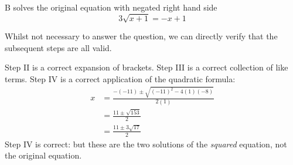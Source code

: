 \documentclass[11pt,a4paper]{article}
\begin{document}
\begin{enumerate}[label=\textbf{\arabic*.},leftmargin=*,itemsep=0pt,start=4]
\begin{djsSolution}{B}
solves the original equation with negated right hand side
\[ 3\sqrt{x+1}=-x+1 \]

Whilst not necessary to answer the question, we can directly verify that the subsequent steps are all valid. 

Step II is a correct expansion of brackets. Step III is a correct collection of like terms. Step IV is a correct application of the quadratic formula:
\[
\begin{aligned}
x&=\frac{-(-11)\pm\sqrt{(-11)^2-4(1)(-8)}}{2(1)}\\[8pt]
&=\frac{11\pm\sqrt{153}}{2}\\[8pt]
&=\frac{11\pm3\sqrt{17}}{2}
\end{aligned}
\]
Step IV is correct: but these are the two solutions of the \emph{squared} equation, not the original equation.
\end{djsSolution}
\end{enumerate}
\clearpage
\thispagestyle{djssolutions}
\vspace*{8pt}
\end{document}
